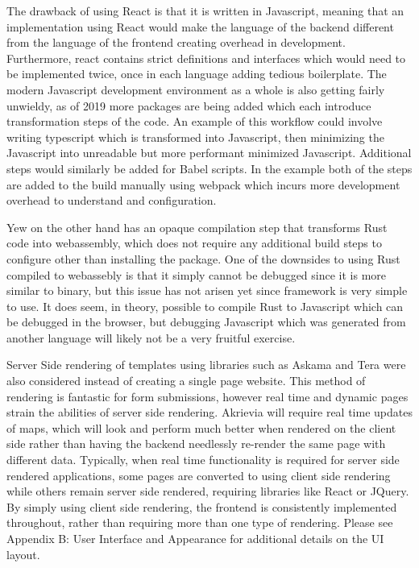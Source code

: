 \pagebreak
The drawback of using React is that it is written in Javascript, meaning that an implementation using React would make the language of the backend different from the language of the frontend creating overhead in development. Furthermore, react contains strict definitions and interfaces which would need to be implemented twice, once in each language adding tedious boilerplate. The modern Javascript development environment as a whole is also getting fairly unwieldy, as of 2019 more packages are being added which each introduce transformation steps of the code. An example of this workflow could involve writing typescript which is transformed into Javascript, then minimizing the Javascript into unreadable but more performant minimized Javascript. Additional steps would similarly be added for \Gls{Babel} scripts. In the example both of the steps are added to the build manually using webpack which incurs more development overhead to understand and configuration.

\bigskip
Yew on the other hand has an opaque compilation step that transforms Rust code into webassembly, which does not require any additional build steps to configure other than installing the package. One of the downsides to using Rust compiled to webassebly is that it simply cannot be debugged since it is more similar to binary, but this issue has not arisen yet since framework is very simple to use. It does seem, in theory, possible to compile Rust to Javascript which can be debugged in the browser, but debugging Javascript which was generated from another language will likely not be a very fruitful exercise.

\bigskip
Server Side rendering of templates using libraries such as Askama and Tera were also considered instead of creating a single page website. This method of rendering is fantastic for form submissions, however real time and dynamic pages strain the abilities of server side rendering. Akrievia will require real time updates of maps, which will look and perform much better when rendered on the client side rather than having the backend needlessly re-render the same page with different data. Typically, when real time functionality is required for server side rendered applications, some pages are converted to using client side rendering while others remain server side rendered, requiring libraries like React or \Gls{JQuery}. By simply using client side rendering, the frontend is consistently implemented throughout, rather than requiring more than one type of rendering.
\bigskip
Please see Appendix B: User Interface and Appearance for additional details on the UI layout.

